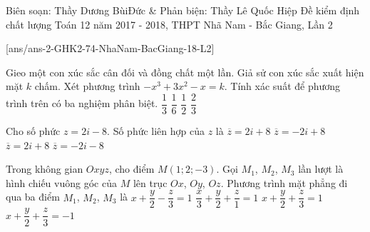 \begin{name}
{Biên soạn: Thầy Dương BùiĐức \& Phản biện: Thầy Lê Quốc Hiệp}
		{Đề kiểm định chất lượng Toán 12 năm 2017 - 2018, THPT Nhã Nam - Bắc Giang, Lần 2}
	\end{name}
\setcounter{ex}{0}
[ans/ans-2-GHK2-74-NhaNam-BacGiang-18-L2]
\begin{ex}%
Gieo một con xúc sắc cân đối và đồng chất một lần. Giả sử con xúc sắc xuất hiện mặt $k$ chấm. Xét phương trình $-x^{3}+3x^{2}-x=k$. Tính xác suất để phương trình trên có ba nghiệm phân biệt.
\choice
{$\dfrac{1}{3}$}
{\True $\dfrac{1}{6}$}
{$\dfrac{1}{2}$}
{$\dfrac{2}{3}$}
\end{ex}
\begin{ex}%
Cho số phức $z=2i-8$. Số phức liên hợp của $z$ là 
\choice
{$\overline{z}=2i+8$}
{$\overline{z}=-2i+8$}
{$\overline{z}=2i+8$}
{\True $\overline{z}=-2i-8$}
\end{ex}
\begin{ex}%
Trong không gian $Oxyz$, cho điểm $M(1;2;-3)$. Gọi $M_{1}$, $M_{2}$, $M_{3}$ lần lượt là hình chiếu vuông góc của $M$ lên trục $Ox$, $Oy$, $Oz$. Phương trình mặt phẳng đi qua ba điểm $M_{1}$, $M_{2}$, $M_{3}$ là
\choice
{\True $x+\dfrac{y}{2}-\dfrac{z}{3}=1$}
{$\dfrac{x}{3}+\dfrac{y}{2}+\dfrac{z}{1}=1$}
{$x+\dfrac{y}{2}+\dfrac{z}{3}=1$}
{$x+\dfrac{y}{2}+\dfrac{z}{3}=-1$}
\end{ex}
